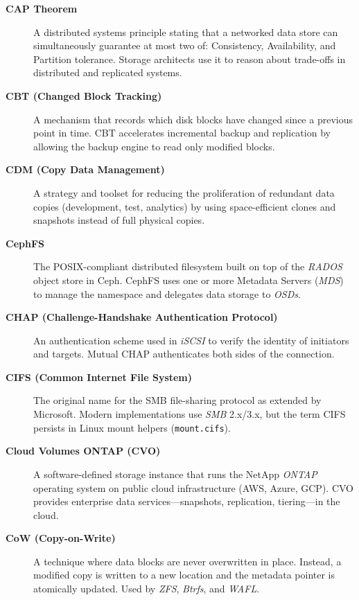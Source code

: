 \begin{description}

\item[\textbf{CAP Theorem}]
A distributed systems principle stating that a networked data store can
simultaneously guarantee at most two of: Consistency, Availability, and
Partition tolerance. Storage architects use it to reason about trade-offs
in distributed and replicated systems.

\item[\textbf{CBT (Changed Block Tracking)}]
A mechanism that records which disk blocks have changed since a previous
point in time. CBT accelerates incremental backup and replication by
allowing the backup engine to read only modified blocks.

\item[\textbf{CDM (Copy Data Management)}]
A strategy and toolset for reducing the proliferation of redundant data
copies (development, test, analytics) by using space-efficient clones and
snapshots instead of full physical copies.

\item[\textbf{CephFS}]
The POSIX-compliant distributed filesystem built on top of the \textit{RADOS}
object store in Ceph. CephFS uses one or more Metadata Servers
(\textit{MDS}) to manage the namespace and delegates data storage to
\textit{OSDs}.

\item[\textbf{CHAP (Challenge-Handshake Authentication Protocol)}]
An authentication scheme used in \textit{iSCSI} to verify the identity of
initiators and targets. Mutual CHAP authenticates both sides of the
connection.

\item[\textbf{CIFS (Common Internet File System)}]
The original name for the SMB file-sharing protocol as extended by
Microsoft. Modern implementations use \textit{SMB} 2.x/3.x, but the term
CIFS persists in Linux mount helpers (\texttt{mount.cifs}).

\item[\textbf{Cloud Volumes ONTAP (CVO)}]
A software-defined storage instance that runs the NetApp \textit{ONTAP}
operating system on public cloud infrastructure (AWS, Azure, GCP). CVO
provides enterprise data services---snapshots, replication, tiering---in the
cloud.

\item[\textbf{CoW (Copy-on-Write)}]
A technique where data blocks are never overwritten in place. Instead, a
modified copy is written to a new location and the metadata pointer is
atomically updated. Used by \textit{ZFS}, \textit{Btrfs}, and
\textit{WAFL}.


\end{description}
